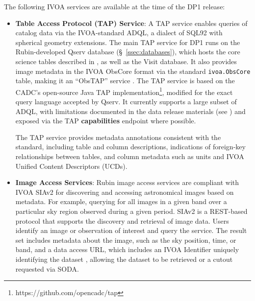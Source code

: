 The following \gls{IVOA} services are available at the time of the DP1 release:
\begin{itemize}
\vspace{0.1cm}
\item \textbf{Table Access Protocol (TAP) Service}: A TAP service \citep{2019ivoa.spec.0927D} enables queries of catalog data via the IVOA-standard \gls{ADQL}, a dialect of SQL92 with spherical geometry extensions.
The main \gls{TAP} service for \gls{DP1} runs on the Rubin-developed \gls{Qserv} database (\S~\ref{ssec:databases}), which hosts the core science tables described in , as well as the Visit database.
It also provides image metadata in the IVOA ObsCore format via the standard \texttt{ivoa.ObsCore} table, making it an ``ObsTAP'' service \citep[ObsTAP;][]{2017ivoa.spec.0509L}.
The TAP service is based on the \gls{CADC}'s open-source Java TAP implementation\footnote{https://github.com/opencadc/tap}, modified for the exact query language accepted by Qserv.
It currently supports a large subset of ADQL, with limitations documented in the data release materials (see ) and exposed via the TAP \textbf{capabilities} endpoint where possible. \

The TAP service provides metadata annotations consistent with the standard, including table and column descriptions, indications of foreign-key relationships between tables, and column metadata such as units and \gls{IVOA} Unified Content Descriptors (UCDs).

\vspace{0.1cm}
\item \textbf{Image Access Services}: Rubin image access services are compliant with \gls{IVOA} SIAv2 \citep[Simple Image Access Protocol, version 2;][]{2025arXiv250100544J,2015ivoa.spec.1223D}
for discovering and accessing astronomical images based on \gls{metadata}.
For example, querying for all images in a given band over a particular sky region observed during a given period.
SIAv2 is a \gls{REST}-based protocol that supports the discovery and retrieval of image data.
Users identify an image or observation of interest and query the service.
The result set includes \gls{metadata} about the image, such as the sky position, time, or band, and a data access URL, which includes an IVOA Identifier uniquely identifying the dataset \citep{DMTN-302}, allowing the dataset to be retrieved or a cutout requested via \gls{SODA}.


\end{itemize}
